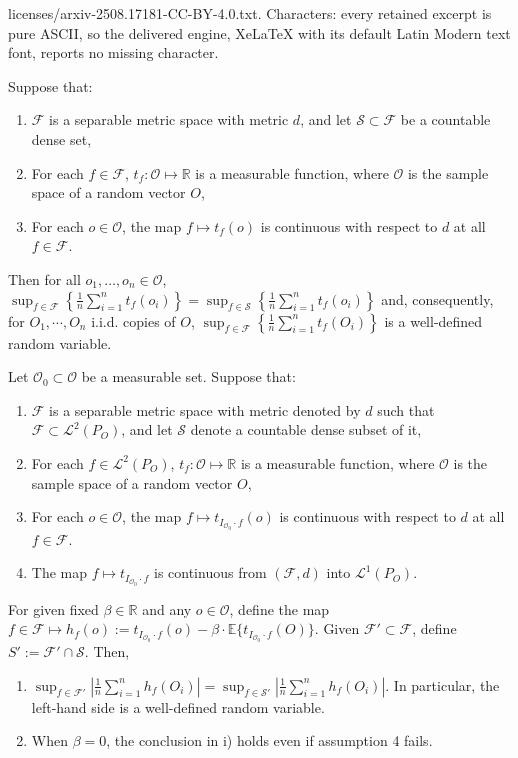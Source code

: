 \documentclass[10pt,a4paper]{amsart}
\newcommand{\E}{\mathbb{E}}
\newcommand{\mc}{\mathcal}
\begin{document}
licenses/arxiv-2508.17181-CC-BY-4.0.txt. Characters: every retained excerpt is pure ASCII, so the delivered engine, XeLaTeX with its default Latin Modern text font, reports no missing character.
\begin{lemma}
Suppose that:
\begin{enumerate}
    \item $\mc{F}$ is a separable metric space with metric $d$, and let $\mc{S}\subset\mc{F}$ be a countable dense set,
    \item For each $f\in\mc{F}$, $t_f:\mc{O}\mapsto\mathbb{R}$ is a measurable function,  where $\mc{O}$ is the sample space of a random vector $O$,
    \item For each $o\in\mc{O}$, the map $f\mapsto t_f(o)$ is continuous with respect to $d$ at all $f \in \mc{F}$.
\end{enumerate}
Then for all $o_1,\dots,o_n\in\mc{O}$, $\sup_{f\in\mc{F}}\left\{\frac{1}{n}\sum_{i=1}^nt_f(o_i) \right \} = \sup_{f\in\mc{S}}\left\{\frac{1}{n}\sum_{i=1}^nt_f(o_i)\right\}$ and, consequently, for $O_1,\cdots,O_n$ i.i.d. copies of $O$, $\sup_{f\in\mc{F}}\left\{\frac{1}{n}\sum_{i=1}^nt_f(O_i)\right\}$ is a well-defined random variable.
    \label{lemma:countable}
\end{lemma}

\begin{corollary}
Let $\mc{O}_0\subset\mc{O}$ be a measurable set. Suppose that:
\begin{enumerate}
    \item $\mc{F}$ is a separable metric space with metric denoted by $d$ such that $\mc{F}\subset\mc{L}^2(P_O)$, and let $\mc{S}$ denote a countable dense subset of it,
    \item For each $f\in\mc{L}^2(P_O)$, $t_f:\mc{O}\mapsto\mathbb{R}$ is a measurable function,  where $\mc{O}$ is the sample space of a random vector $O$,
    \item For each $o\in\mc{O}$, the map $f\mapsto t_{I_{\mc{O}_0}\cdot f}(o)$ is continuous with respect to $d$ at all $f \in \mc{F}$.
    \item The map $f\mapsto t_{I_{\mc{O}_0}\cdot f}$ is continuous from $(\mc{F},d)$ into $\mc{L}^1(P_O)$.
\end{enumerate}
For given fixed $\beta\in\mathbb{R}$ and any $o\in\mc{O}$, define the map $f\in\mc{F}\mapsto h_f(o):= t_{I_{\mc{O}_0}\cdot f}(o)-\beta\cdot\E\{t_{I_{\mc{O}_0}\cdot f}(O)\}$. Given $\mc{F}'\subset\mc{F}$, define $S':=\mc{F}'\cap\mc{S}$. Then,
\begin{enumerate}
    \item[i)] $\sup_{f\in \mc{F}'}\left\vert \frac{1}{n}\sum_{i=1}^nh_f(O_i) \right\vert
= \sup_{f \in \mc{S}'}\left\vert \frac{1}{n}\sum_{i=1}^nh_f(O_i) \right\vert$. In particular, the left-hand side is a well-defined random variable.
\item[ii)] When $\beta=0$, the conclusion in i) holds even if assumption 4 fails.
\end{enumerate}
 \label{corollary:countable_Lf}
\end{corollary}
\end{document}
